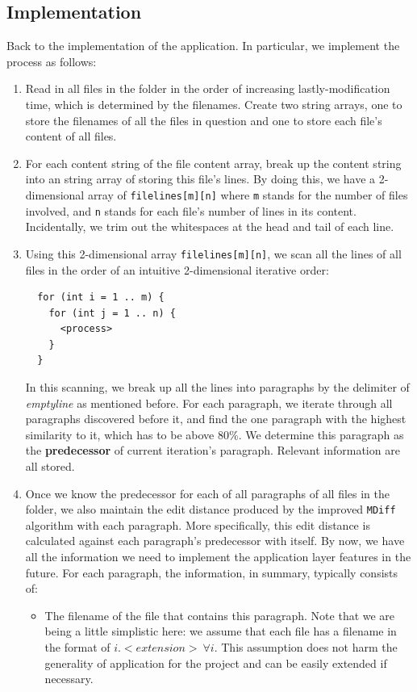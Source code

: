 \documentclass{article}
\begin{document}
\subsection{Implementation}
Back to the implementation of the application. In particular, we implement the process as follows:
\begin{enumerate}
  \item Read in all files in the folder in the order of increasing lastly-modification time, which is determined by the filenames. Create two string arrays, one to store the filenames of all the files in question and one to store each file's content of all files. 
  \item For each content string of the file content array, break up the content string into an string array of storing this file's lines. By doing this, we have a 2-dimensional array of \texttt{filelines[m][n]} where \texttt{m} stands for the number of files involved, and \texttt{n} stands for each file's number of lines in its content. Incidentally, we trim out the whitespaces at the head and tail of each line. 
  \item Using this 2-dimensional array \texttt{filelines[m][n]}, we scan all the lines of all files in the order of an intuitive 2-dimensional iterative order: 
  \begin{lstlisting}
  for (int i = 1 .. m) {
    for (int j = 1 .. n) {
      <process>
    }
  }
  \end{lstlisting}
  In this scanning, we break up all the lines into paragraphs by the delimiter of \textit{emptyline} as mentioned before. For each paragraph, we iterate through all paragraphs discovered before it, and find the one paragraph with the highest similarity to it, which has to be above 80\%. We determine this paragraph as the \textbf{predecessor} of current iteration's paragraph. Relevant information are all stored. 
  \item Once we know the predecessor for each of all paragraphs of all files in the folder, we also maintain the edit distance produced by the improved \texttt{MDiff} algorithm with each paragraph. More specifically, this edit distance is calculated against each paragraph's predecessor with itself. By now, we have all the information we need to implement the application layer features in the future. For each paragraph, the information, in summary, typically consists of:
  \begin{itemize}
    \item The filename of the file that contains this paragraph. Note that we are being a little simplistic here: we assume that each file has a filename in the format of $i.<extension>\ \forall i$. This assumption does not harm the generality of application for the project and can be easily extended if necessary.

\end{itemize}
\end{enumerate}
\end{document}
